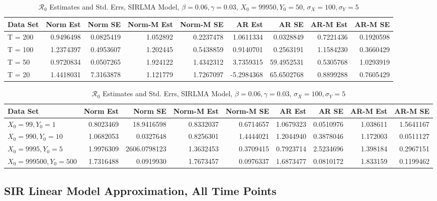 \documentclass[12pt]{article}
\newcommand{\rr}{\ensuremath{\mathcal{R}_0}}
\begin{document}
\begin{table}[H]
	
	\caption{\label{tab:}$\rr$ Estimates and Std. Errs, SIRLMA Model,
		$\beta = 0.06, \gamma = 0.03$, $X_0 = 99950, Y_0 = 50$, $\sigma_X = 100, \sigma_Y = 5$}
	\centering
	\begin{tabular}[t]{l|r|r|r|r|r|r|r|r}
		\hline
		Data Set & Norm Est & Norm SE & Norm-M Est & Norm-M SE & AR Est & AR SE & AR-M Est & AR-M SE\\
		\hline
		T = 200 & 0.9496498 & 0.0825419 & 1.052892 & 0.2237478 & 1.0611334 & 0.0328849 & 0.7221436 & 0.1920598\\
		\hline
		T = 100 & 1.2374397 & 0.4953607 & 1.202445 & 0.5438859 & 0.9140701 & 0.2563191 & 1.1584230 & 0.3660429\\
		\hline
		T = 50 & 0.9720834 & 0.0507265 & 1.924122 & 1.4342312 & 3.7359315 & 59.4952531 & 0.5305768 & 1.0293919\\
		\hline
		T = 20 & 1.4418031 & 7.3163878 & 1.121779 & 1.7267097 & -5.2984368 & 65.6502768 & 0.8899288 & 0.7605429\\
		\hline
	\end{tabular}
\end{table}

\begin{table}[H]
	
	\caption{\label{tab:}$\rr$ Estimates and Std. Errs, SIRLMA Model,
		$\beta = 0.06, \gamma = 0.03$, $\sigma_X = 100, \sigma_Y = 5$}
	\centering
	\begin{tabular}[t]{l|r|r|r|r|r|r|r|r}
		\hline
		Data Set & Norm Est & Norm SE & Norm-M Est & Norm-M SE & AR Est & AR SE & AR-M Est & AR-M SE\\
		\hline
		$X_0 = 99, Y_0 = 1$ & 0.8023469 & 18.9416598 & 0.8332037 & 0.6714657 & 1.0679323 & 0.0510976 & 1.038611 & 1.5641167\\
		\hline
		$X_0 = 990, Y_0 = 10$ & 1.0682053 & 0.0327648 & 0.8256301 & 1.4444021 & 1.2044940 & 0.3878046 & 1.172003 & 0.0511127\\
		\hline
		$X_0 = 9995, Y_0 = 5$ & 1.9976309 & 2606.0798123 & 1.3632453 & 0.3709415 & 0.7923714 & 2.5234696 & 1.398184 & 0.2967151\\
		\hline
		$X_0 = 999500, Y_0 = 500$ & 1.7316488 & 0.0919930 & 1.7673457 & 0.0976337 & 1.6873477 & 0.0810172 & 1.833159 & 0.1199462\\
		\hline
	\end{tabular}
\end{table}

\subsection{SIR Linear Model Approximation, All Time Points}
\end{document}
